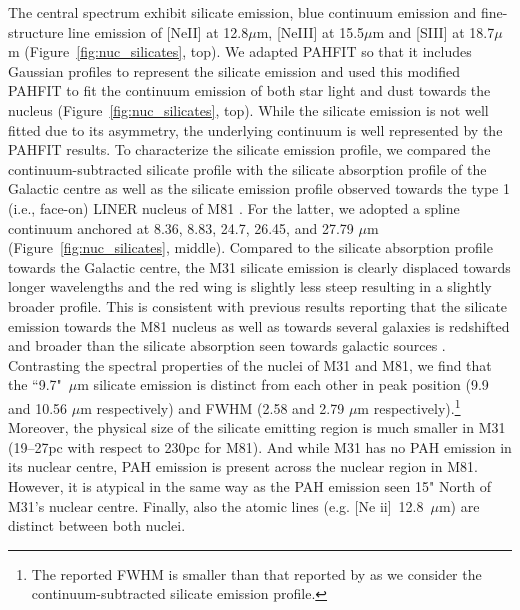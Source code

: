 The central spectrum exhibit silicate emission, blue continuum emission and fine-structure line emission of [NeII] at 12.8$\mu$m, [NeIII] at 15.5$\mu$m and [SIII] at 18.7$\mu$m (Figure~\ref{fig:nuc_silicates}, top). We adapted PAHFIT so that it includes Gaussian profiles to represent the silicate emission and used this modified PAHFIT to fit the continuum emission of both star light and dust towards the nucleus (Figure~\ref{fig:nuc_silicates}, top). While the silicate emission is not well fitted due to its asymmetry, the underlying continuum is well represented by the PAHFIT results. To characterize the silicate emission profile, we compared the continuum-subtracted silicate profile with the silicate absorption profile of the Galactic centre \citep{Chiar2006} as well as the silicate emission profile observed towards the type 1 (i.e., face-on) LINER nucleus of M81 \citep[][Figure~\ref{fig:nuc_silicates}, bottom]{Smith2010}. For the latter, we adopted a spline continuum anchored at 8.36, 8.83, 24.7, 26.45, and 27.79 $\mu$m (Figure~\ref{fig:nuc_silicates}, middle). Compared to the silicate absorption profile towards the Galactic centre, the M31 silicate emission is clearly displaced towards longer wavelengths and the red wing is slightly less steep resulting in a slightly broader profile. This is consistent with previous results reporting that the silicate emission towards  the M81 nucleus as well as towards several galaxies is redshifted and broader than the silicate absorption seen towards galactic sources \citep[e.g.][]{Sturm2005, Sturm2006, Netzer2007, Smith2010}. Contrasting the spectral properties of the nuclei of M31 and M81, we find that the ``9.7"~$\mu$m silicate emission is distinct from each other in peak position (9.9 and 10.56 $\mu$m respectively) and FWHM (2.58 and 2.79 $\mu$m respectively).\footnote{The reported FWHM is smaller than that reported by \citet{Smith2010} as we consider the continuum-subtracted silicate emission profile.} Moreover, the physical size of the silicate emitting region is much smaller in M31 (19--27pc with respect to 230pc for M81). And while M31 has no PAH emission in its nuclear centre, PAH emission is present across the nuclear region in M81. However, it is atypical in the same way as the PAH emission seen 15" North of M31's nuclear centre. Finally, also the atomic lines (e.g. [Ne {\sc ii}]~12.8~$\mu$m) are distinct between both nuclei. 


